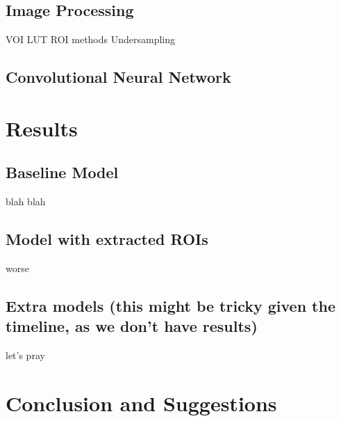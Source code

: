 \documentclass[conference]{IEEEtran}
\begin{document}
\subsection{Image Processing}

VOI LUT
ROI methods
Undersampling 
\subsection{Convolutional Neural Network}

\section{Results}
\subsection{Baseline Model}
blah blah
\subsection{Model with extracted ROIs}
worse 
\subsection{Extra models (this might be tricky given the timeline, as we don't have results)}
let's pray
\section{Conclusion and Suggestions}
\end{document}
